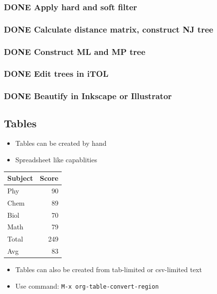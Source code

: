 \documentclass[a4paper, twoside]{article}
\begin{document}
\subsubsection{{\bfseries\sffamily DONE} Apply hard and soft filter}
\label{sec:orge33981f}
\subsubsection{{\bfseries\sffamily DONE} Calculate distance matrix, construct NJ tree}
\label{sec:orgfdd849a}
\subsubsection{{\bfseries\sffamily DONE} Construct ML and MP tree}
\label{sec:org6d893d0}
\subsubsection{{\bfseries\sffamily DONE} Edit trees in iTOL}
\label{sec:orgc11b234}
\subsubsection{{\bfseries\sffamily DONE} Beautify in Inkscape or Illustrator}
\label{sec:orgdcaa0fb}

\subsection{Tables}
\label{sec:org7a119bd}
\begin{itemize}
\item Tables can be created by hand
\item Spreadsheet like capablities
\end{itemize}

\begin{center}
\begin{tabular}{lr}
\hline
Subject & Score\\
\hline
Phy & 90\\
Chem & 89\\
Biol & 70\\
Math & 79\\
\hline
Total & 249\\
\hline
Avg & 83\\
\hline
\end{tabular}
\end{center}

\begin{itemize}
\item Tables can also be created from tab-limited or csv-limited text
\item Use command: \texttt{M-x org-table-convert-region}
\end{itemize}
\end{document}
